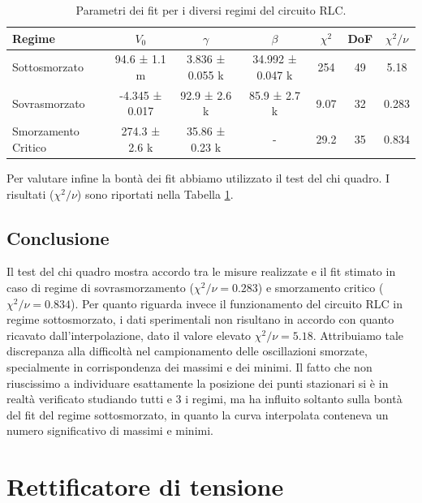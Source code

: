 \documentclass[a4paper]{article}
\begin{document}

\begin{table}[htbp]
\centering
\begin{tabular}{|l|cccccc|} %
\hline
Regime & $V_0$ & $\gamma$ & $\beta$ & $\chi^2$ & DoF & $\chi^2/\nu$ \\
\hline\hline
Sottosmorzato       & 94.6 ± 1.1 m     & 3.836 ± 0.055 k & 34.992 ± 0.047 k & 254  & 49 & 5.18  \\
Sovrasmorzato       & -4.345 ± 0.017   & 92.9 ± 2.6 k    & 85.9 ± 2.7 k     & 9.07 & 32 & 0.283 \\
Smorzamento Critico & 274.3 ± 2.6 k    & 35.86 ± 0.23 k  & -                & 29.2 & 35 & 0.834 \\ %
\hline
\end{tabular}
\caption{Parametri dei fit per i diversi regimi del circuito RLC.}
\label{tab:rlc_fit_results} %
\end{table}

Per valutare infine la bontà dei fit abbiamo utilizzato il test del chi quadro. I risultati ($\chi^2/\nu$) sono riportati nella Tabella \ref{tab:rlc_fit_results}.

\subsection{Conclusione}
Il test del chi quadro mostra accordo tra le misure realizzate e il fit stimato in caso di regime di sovrasmorzamento ($\chi^2/\nu = 0.283$) e smorzamento critico ($\chi^2/\nu = 0.834$). Per quanto riguarda invece il funzionamento del circuito RLC in regime sottosmorzato, i dati sperimentali non risultano in accordo con quanto ricavato dall'interpolazione, dato il valore elevato $\chi^2/\nu = 5.18$. Attribuiamo tale discrepanza alla difficoltà nel campionamento delle oscillazioni smorzate, specialmente in corrispondenza dei massimi e dei minimi. Il fatto che non riuscissimo a individuare esattamente la posizione dei punti stazionari si è in realtà verificato studiando tutti e 3 i regimi, ma ha influito soltanto sulla bontà del fit del regime sottosmorzato, in quanto la curva interpolata conteneva un numero significativo di massimi e minimi.


\section{Rettificatore di tensione}
\end{document}
